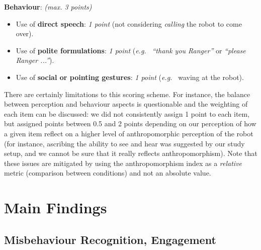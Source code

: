 \documentclass[letterpaper, 10pt, conference]{ieeeconf}
\newcommand{\eg}{{\textit{e.g.~}}}
\begin{document}
\textbf{Behaviour}: \textit{(max. 3 points)}
\begin{itemize}
    \item Use of \textbf{direct speech}: \textit{1 point} (not considering
        \textit{calling} the robot to come over).

    \item Use of \textbf{polite formulations}: \textit{1 point} (\eg
        \textit{``thank you Ranger''} or \textit{``please Ranger ...''}).

    \item Use of \textbf{social or pointing gestures}: \textit{1 point} (\eg
        waving at the robot).

\end{itemize}

There are certainly limitations to this scoring scheme. For instance, the
balance between perception and behaviour aspects is questionable and the
weighting of each item can be discussed: we did not consistently assign 1 point
to each item, but assigned points between 0.5 and 2 points depending on our
perception of how a given item reflect on a higher level of anthropomorphic
perception of the robot (for instance, ascribing the ability to see and hear was
suggested by our study setup, and we cannot be sure that it really reflects
anthropomorphism). Note that these issues are mitigated by using the
anthropomorphism index as a \emph{relative} metric (comparison between
conditions) and not an absolute value.

\section{Main Findings}

\subsection{Misbehaviour Recognition, Engagement}

\end{document}
